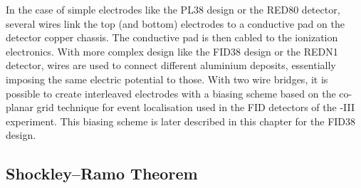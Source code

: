 In the case of simple electrodes like the PL38 design or the RED80 detector, several wires link the top (and bottom) electrodes to a conductive pad on the detector copper chassis. The conductive pad is then cabled to the ionization electronics.
With more complex design like the FID38 design or the REDN1 detector, wires are used to connect different aluminium deposits, essentially imposing the same electric potential to those. With two wire bridges, it is possible to create interleaved electrodes with a biasing scheme based on the co-planar grid technique for event localisation used in the FID detectors of the \Edelweiss{}-III experiment. This biasing scheme is later described in this chapter for the FID38 design.

\subsection{Shockley–Ramo Theorem}
\label{par:shockley-ramo}


